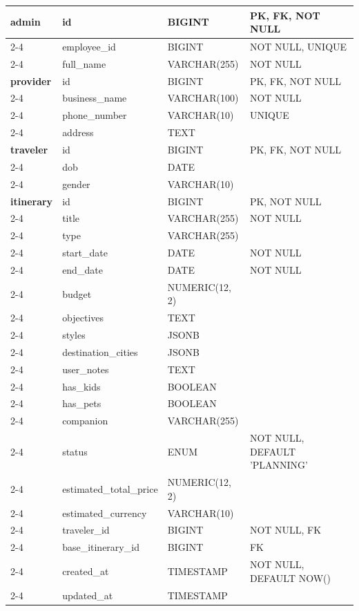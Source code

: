 {\begin{longtable}{|p{2.5cm}|p{3.8cm}|p{3.8cm}|p{4.2cm}|}
\textbf{admin} 
    & id & BIGINT & PK, FK, NOT NULL \\ \cline{2-4} 
    & employee\_id & BIGINT & NOT NULL, UNIQUE \\ \cline{2-4} 
    & full\_name & VARCHAR(255) & NOT NULL \\ \hline

\textbf{provider} 
    & id & BIGINT & PK, FK, NOT NULL \\ \cline{2-4} 
    & business\_name & VARCHAR(100) & NOT NULL \\ \cline{2-4} 
    & phone\_number & VARCHAR(10) & UNIQUE \\ \cline{2-4} 
    & address & TEXT & \\ \hline

\textbf{traveler} 
    & id & BIGINT & PK, FK, NOT NULL \\ \cline{2-4} 
    & dob & DATE & \\ \cline{2-4} 
    & gender & VARCHAR(10) & \\ \hline

\textbf{itinerary} 
    & id & BIGINT & PK, NOT NULL \\ \cline{2-4} 
    & title & VARCHAR(255) & NOT NULL \\ \cline{2-4} 
    & type & VARCHAR(255) & \\ \cline{2-4} 
    & start\_date & DATE & NOT NULL \\ \cline{2-4} 
    & end\_date & DATE & NOT NULL \\ \cline{2-4} 
    & budget & NUMERIC(12, 2) & \\ \cline{2-4} 
    & objectives & TEXT & \\ \cline{2-4} 
    & styles & JSONB & \\ \cline{2-4}
    & destination\_cities & JSONB & \\ \cline{2-4}
    & user\_notes & TEXT & \\ \cline{2-4}
    & has\_kids & BOOLEAN & \\ \cline{2-4}
    & has\_pets & BOOLEAN & \\ \cline{2-4}
    & companion & VARCHAR(255) & \\ \cline{2-4}
    & status & ENUM & NOT NULL, DEFAULT 'PLANNING' \\ \cline{2-4} 
    & estimated\_total\_price & NUMERIC(12, 2) & \\ \cline{2-4}
    & estimated\_currency & VARCHAR(10) & \\ \cline{2-4}
    & traveler\_id & BIGINT & NOT NULL, FK \\ \cline{2-4} 
    & base\_itinerary\_id & BIGINT & FK \\ \cline{2-4}
    & created\_at & TIMESTAMP & NOT NULL, DEFAULT NOW() \\ \cline{2-4}
    & updated\_at & TIMESTAMP & \\ \hline


\end{longtable}}
